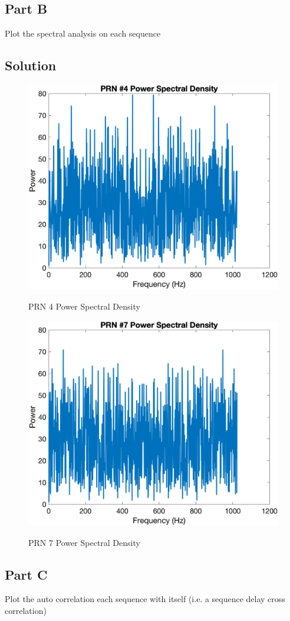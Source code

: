 \documentclass{article}
\begin{document}
\subsection*{Part B}
Plot the spectral analysis on each sequence

\subsection*{Solution}
\begin{figure}[H]
    \centering
    \includegraphics[width=0.75\linewidth]{../figures/p8_prn4_psd.png}\label{p8_prn4_psd}
    \caption{PRN 4 Power Spectral Density}
\end{figure}
\begin{figure}[H]
    \centering
    \includegraphics[width=0.75\linewidth]{../figures/p8_prn7_psd.png}\label{p8_prn7_psd}
    \caption{PRN 7 Power Spectral Density}
\end{figure}

\subsection*{Part C}
Plot the auto correlation each sequence with itself (i.e. a sequence delay cross
correlation)
\end{document}
